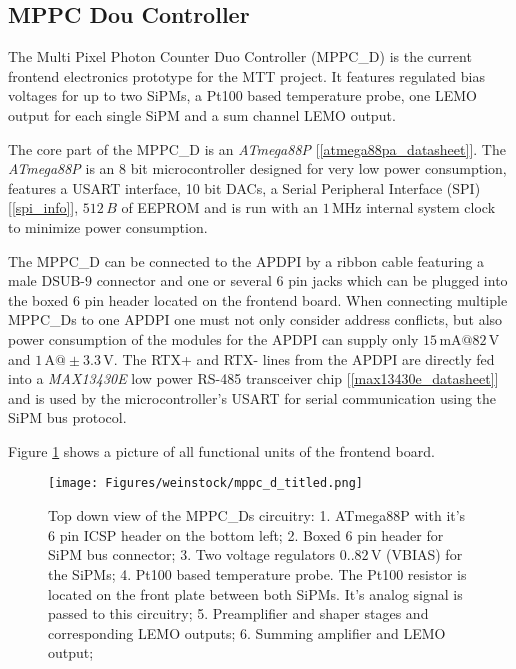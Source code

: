 \documentclass[]{article}
\begin{document}
\subsection{MPPC Dou Controller}

The Multi Pixel Photon Counter Duo Controller (MPPC\_D) is the current frontend electronics prototype for the MTT project. It features regulated bias voltages for up to two SiPMs, 
a Pt100 based temperature probe, one LEMO output for each single SiPM and a sum channel LEMO output.

The core part of the MPPC\_D is an \emph{ATmega88P} [\ref{atmega88pa_datasheet}]. The \emph{ATmega88P} is an 8 bit microcontroller designed for very low power consumption, features a 
USART interface, 10 bit DACs, a Serial Peripheral Interface (SPI) [\ref{spi_info}], $512\,B$ of EEPROM and is run with an $1\,\text{MHz}$ internal system clock to minimize 
power consumption. 

The MPPC\_D can be connected to the APDPI by a ribbon cable featuring a male DSUB-9 connector and one or several 6 pin jacks which can be plugged into the boxed 6 pin header
located on the frontend board. When connecting multiple MPPC\_Ds to one APDPI one must not only consider address conflicts, but also power consumption of the modules for the APDPI
can supply only $15\,\text{mA}@82\,\text{V}$ and $1\,\text{A}@\pm3.3\,\text{V}$. The RTX+ and RTX- lines from the APDPI are directly fed into a \emph{MAX13430E} low power RS-485 
transceiver chip [\ref{max13430e_datasheet}] and is used by the microcontroller's USART for serial communication using the SiPM bus protocol.  

Figure \ref{mppc_top} shows a picture of all functional units of the frontend board.
	
	\begin{figure}[]
		\centering
			\texttt{[image: Figures/weinstock/mppc\_d\_titled.png]}
		\caption{Top down view of the MPPC\_Ds circuitry: 1. ATmega88P with it's 6 pin ICSP header on the bottom left; 
								  2. Boxed 6 pin header for SiPM bus connector;
								  3. Two voltage regulators $0..82\,\text{V}$ (VBIAS) for the SiPMs;
								  4. Pt100 based temperature probe. The Pt100 resistor is located on the front plate between both SiPMs. 
								       It's analog signal is passed to this circuitry;
								  5. Preamplifier and shaper stages and corresponding LEMO outputs; 
								  6. Summing amplifier and LEMO output;
			}
		\label{mppc_top}
	\end{figure}	
\end{document}
